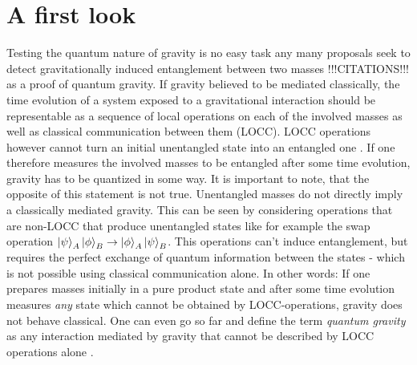 \chapter{A first look}\label{cha:first-look}

Testing the quantum nature of gravity is no easy task any many proposals seek to detect gravitationally induced entanglement between two masses !!!CITATIONS!!! as a proof of quantum gravity. 
If gravity believed to be mediated classically, the time evolution of a system exposed to a gravitational interaction should be representable as a sequence of local operations on each of the involved masses as well as classical communication between them (LOCC).
LOCC operations however cannot turn an initial unentangled state into an entangled one \cite{Plenio_2005a}.
If one therefore measures the involved masses to be entangled after some time evolution, gravity has to be quantized in some way.
It is important to note, that the opposite of this statement is not true. Unentangled masses do not directly imply a classically mediated gravity.
This can be seen by considering operations that are non-LOCC that produce unentangled states like for example the swap operation $\ket{\psi}_A\ket{\phi}_B \rightarrow \ket{\phi}_A\ket{\psi}_B$. This operations can't induce entanglement, but requires the perfect exchange of quantum information between the states - which is not possible using classical communication alone.
In other words: If one prepares masses initially in a pure product state and after some time evolution measures \textit{any} state which cannot be obtained by LOCC-operations, gravity does not behave classical. One can even go so far and define the term \emph{quantum gravity} as any interaction mediated by gravity that cannot be described by LOCC operations alone \cite{Lami_2024}.


